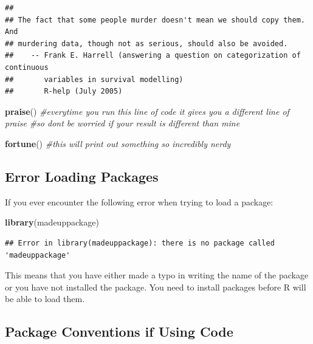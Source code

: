 \documentclass[
]{book}
\newenvironment{Shaded}{\begin{snugshade}}{\end{snugshade}}
\newcommand{\CommentTok}[1]{\textcolor[rgb]{0.56,0.35,0.01}{\textit{#1}}}
\newcommand{\FunctionTok}[1]{\textcolor[rgb]{0.13,0.29,0.53}{\textbf{#1}}}
\newcommand{\NormalTok}[1]{#1}
\begin{document}
\begin{verbatim}
## 
## The fact that some people murder doesn't mean we should copy them. And
## murdering data, though not as serious, should also be avoided.
##    -- Frank E. Harrell (answering a question on categorization of continuous
##       variables in survival modelling)
##       R-help (July 2005)
\end{verbatim}

\begin{Shaded}
\begin{Highlighting}[]
\FunctionTok{praise}\NormalTok{() }\CommentTok{\#everytime you run this line of code it gives you a different line of praise}
\CommentTok{\#so don\textquotesingle{}t be worried if your result is different than mine}

\FunctionTok{fortune}\NormalTok{() }\CommentTok{\#this will print out something so incredibly nerdy }
\end{Highlighting}
\end{Shaded}

\hypertarget{error-loading-packages}{%
\subsection{Error Loading Packages}\label{error-loading-packages}}

If you ever encounter the following error when trying to load a package:

\begin{Shaded}
\begin{Highlighting}[]
\FunctionTok{library}\NormalTok{(madeuppackage)}
\end{Highlighting}
\end{Shaded}

\begin{verbatim}
## Error in library(madeuppackage): there is no package called 'madeuppackage'
\end{verbatim}

This means that you have either made a typo in writing the name of the package or you have not installed the package. You need to install packages before R will be able to load them.

\hypertarget{package-conventions-if-using-code}{%
\subsection{Package Conventions if Using Code}\label{package-conventions-if-using-code}}
\end{document}
